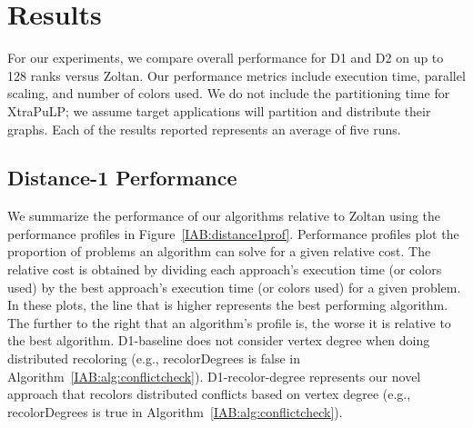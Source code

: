 \section{Results}



For our experiments, we compare overall performance for D1 and D2 on up to 128 ranks versus Zoltan.
Our performance metrics include execution time, parallel scaling, and number of colors used. 
We do not include the partitioning time for XtraPuLP; we assume target applications will partition and distribute their graphs. 
Each of the results reported represents an average of five runs.

\subsection{Distance-1 Performance}



We summarize the performance of our algorithms relative to Zoltan 
using the performance profiles in Figure~\ref{IAB:distance1prof}.
Performance profiles plot the proportion of problems an algorithm can solve for a given relative cost.
The relative cost is obtained by dividing each approach's execution time (or colors used) by the best approach's execution time (or colors used) for a given problem.
In these plots, the line that is higher represents the best performing algorithm. 
The further to the right that an algorithm's profile is, the worse it is relative to the best algorithm.
D1-baseline does not consider vertex degree when doing distributed recoloring (e.g., recolorDegrees is false in Algorithm~\ref{IAB:alg:conflictcheck}).
D1-recolor-degree represents our novel approach that recolors distributed conflicts based on vertex degree (e.g., recolorDegrees is true in Algorithm~\ref{IAB:alg:conflictcheck}).

